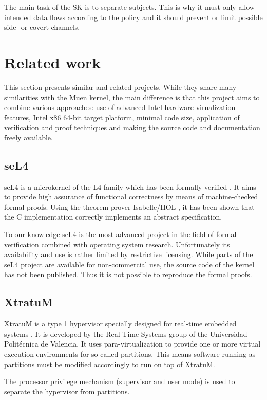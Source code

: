 The main task of the SK is to separate subjects. This is why it must only allow
intended data flows according to the policy and it should prevent or limit
possible side- or covert-channels.

\section{Related work}
This section presents similar and related projects. While they share many
similarities with the Muen kernel, the main difference is that this project aims
to combine various approaches: use of advanced Intel hardware virualization
features, Intel x86 64-bit target platform, minimal code size, application of
verification and proof techniques and making the source code and documentation
freely available.

\subsection{seL4}
seL4 is a microkernel of the L4 \cite{Liedtke:1996:TRM:234215.234473} family
which has been formally verified \cite{Klein_EHACDEEKNSTW_09}. It aims to
provide high assurance of functional correctness by means of machine-checked
formal proofs. Using the theorem prover Isabelle/HOL
\cite{Nipkow-Paulson-Wenzel:2002}, it has been shown that the C implementation
correctly implements an abstract specification.

To our knowledge seL4 is the most advanced project in the field of formal
verification combined with operating system research. Unfortunately its
availability and use is rather limited by restrictive licensing. While parts of
the seL4 project are available for non-commercial use, the source code of the
kernel has not been published. Thus it is not possible to reproduce the formal
proofs.

\subsection{XtratuM}
XtratuM is a type 1 hypervisor specially designed for real-time embedded
systems \cite{xtratum:2009a}. It is developed by the Real-Time Systems group of
the Universidad Politécnica de Valencia. It uses para-virtualization to provide
one or more virtual execution environments for so called partitions. This means
software running as partitions must be modified accordingly to run on top of
XtratuM.

The processor privilege mechanism (supervisor and user mode) is used to
separate the hypervisor from partitions.

